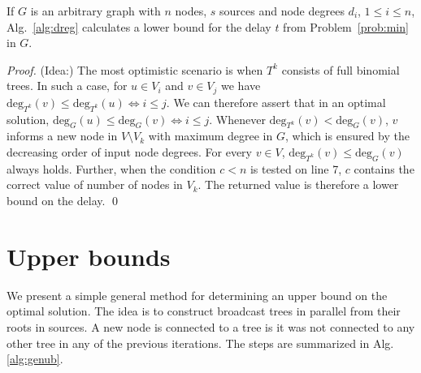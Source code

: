 \begin{proposition}
If $G$ is an arbitrary graph with $n$ nodes, $s$ sources and node degrees $d_i$, $1\leq i\leq n$, Alg.~\ref{alg:dreg} calculates a lower bound for the delay $t$ from Problem~\ref{prob:min} in $G$.
\end{proposition}
\begin{proof}
(Idea:)
The most optimistic scenario is when $T^k$ consists of full binomial trees.
In such a case, for $u\in V_i$ and $v\in V_j$ we have $\text{deg}_{T^k}(v)\leq\text{deg}_{T^k}(u)\Leftrightarrow i\leq j$.
We can therefore assert that in an optimal solution, $\text{deg}_G(u)\leq\text{deg}_G(v)\Leftrightarrow i\leq j$.
Whenever $\text{deg}_{T^k}(v)<\text{deg}_G(v)$, $v$ informs a new node in $V\setminus V_k$ with maximum degree in $G$, which is ensured by the decreasing order of input node degrees.
For every $v\in V$, $\text{deg}_{T^k}(v)\leq \text{deg}_G(v)$ always holds.
Further, when the condition $c<n$ is tested on line 7, $c$ contains the correct value of number of nodes in $V_k$.
The returned value is therefore a lower bound on the delay.
\qed
\end{proof}

\section{Upper bounds}

We present a simple general method for determining an upper bound on the optimal solution.
The idea is to construct broadcast trees in parallel from their roots in sources.
A new node is connected to a tree is it was not connected to any other tree in any of the previous iterations.
The steps are summarized in Alg. \ref{alg:genub}.


